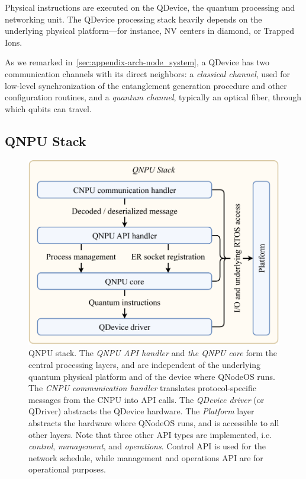Physical instructions are executed on the \ac{QDevice}, the quantum processing and networking unit. The \ac{QDevice} processing stack heavily depends on the underlying physical platform---for instance, \ac{NV} centers in diamond, or Trapped Ions.

As we remarked in~\cref{sec:appendix-arch-node_system}, a \ac{QDevice} has two communication channels with its direct neighbors: a \emph{classical channel}, used for low-level synchronization of the entanglement generation procedure and other configuration routines, and a \emph{quantum channel}, typically an optical fiber, through which qubits can travel.

\subsection{QNPU Stack}
\label{sec:design:qnpu_stack}

\begin{figure}
\begin{center}
\includegraphics[width=\linewidth]{figures/qnodeos/supplementary/qnodeos-stack.pdf}
\end{center}
\caption[]{\ac{QNPU} stack. The \emph{\ac{QNPU} \acs{API} handler} and \emph{the \ac{QNPU} core} form the central processing layers, and are independent of the underlying quantum physical platform and of the device where \ac{QNodeOS} runs. The \emph{\ac{CNPU} communication handler} translates protocol-specific messages from the \ac{CNPU} into \acs{API} calls. The \emph{\ac{QDevice} driver} (or \ac{QDriver}) abstracts the \ac{QDevice} hardware. The \emph{Platform} layer abstracts the hardware where \ac{QNodeOS} runs, and is accessible to all other layers. Note that three other \ac{API} types are implemented, i.e. \emph{control}, \emph{management}, and \emph{operations}. Control \ac{API} is used for the network schedule, while management and operations \ac{API} are for operational purposes. }
\label{fig:qnodeos-stack}
\end{figure}


